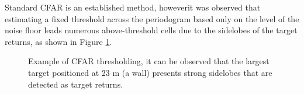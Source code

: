 			Standard CFAR is an established method, howeverit was observed that estimating a fixed threshold across the periodogram based only on the level of the noise floor leads numerous above-threshold cells due to the sidelobes of the target returns, as shown in Figure \ref{fig:RadThesh_CFAR_abv_thresh_doubl}.
			
				\begin{figure}[H]
				\centering
				
				\hfill
				
				\caption[]{Example of CFAR thresholding, it can be observed that the largest target positioned at 23 m (a wall) presents strong sidelobes that are detected as target returns.}
				\label{fig:RadThesh_CFAR_abv_thresh_doubl}
			\end{figure}
			
